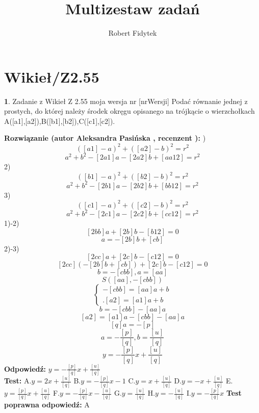 \documentclass[12pt, a4paper]{article}
\title{Multizestaw zadań}
\author{Robert Fidytek}
\date{}
\theoremstyle{definition} %
\newtheorem{zad}{}
\newcommand{\kategoria}[1]{\section{#1}} %
\newcommand{\zadStart}[1]{\begin{zad}#1\newline} %
\newcommand{\zadStop}{\end{zad}}   %
\newcommand{\rozwStart}[2]{\noindent \textbf{Rozwiązanie (autor #1 , recenzent #2): }\newline} %
\newcommand{\rozwStop}{\newline}                                            %
\newcommand{\odpStart}{\noindent \textbf{Odpowiedź:}\newline}    %
\newcommand{\odpStop}{\newline}                                             %
\newcommand{\testStart}{\noindent \textbf{Test:}\newline} %
\newcommand{\testStop}{\newline} %
\newcommand{\kluczStart}{\noindent \textbf{Test poprawna odpowiedź:}\newline} %
\newcommand{\kluczStop}{\newline} %
\begin{document}
\maketitle


\kategoria{Wikieł/Z2.55}
\zadStart{Zadanie z Wikieł Z 2.55 moja wersja nr [nrWersji]}
Podać równanie jednej z prostych, do której należy środek okręgu opisanego na trójkącie o wierzchołkach A([a1],[a2]),B([b1],[b2]),C([c1],[c2]).
\zadStop
\rozwStart{Aleksandra Pasińska}{}
1) $$([a1]-a)^2+([a2]-b)^2=r^2$$
$$a^2+b^2-[2a1]a-[2a2]b+[aa12]=r^2$$
2) $$([b1]-a)^2+([b2]-b)^2=r^2$$
$$a^2+b^2-[2b1]a-[2b2]b+[bb12]=r^2$$
3) $$([c1]-a)^2+([c2]-b)^2=r^2$$
$$a^2+b^2-[2c1]a-[2c2]b+[cc12]=r^2$$
1)-2)$$[2bb]a+[2b]b-[b12]=0$$
$$a=-[2b]b+[cb]$$
2)-3)$$[2cc]a+[2c]b-[c12]=0$$
$$[2cc](-[2b]b+[cb])+[2c]b-[c12]=0$$
$$b=-[cbb], a=[aa]$$
$$S([aa],-[cbb])$$
$$\left\{ \begin{array}{ll}
-[cbb]=[aa]a+b\\ 
.[a2]=[a1]a+b 
\end{array} \right.$$
$$b=-[cbb]-[aa]a$$
$$[a2]=[a1]a-[cbb]-[aa]a$$
$$[q]a=-[p]$$
$$a=-\frac{[p]}{[q]}, b=\frac{[u]}{[q]}$$
$$y=-\frac{[p]}{[q]}x+\frac{[u]}{[q]}$$
\rozwStop
\odpStart
$y=-\frac{[p]}{[q]}x+\frac{[u]}{[q]}$\\
\odpStop
\testStart
A.$y=2x+\frac{[u]}{[q]}$
B.$y=-\frac{[p]}{[q]}x-1$
C.$y=x+\frac{[u]}{[q]}$
D.$y=-x+\frac{[u]}{[q]}$
E.$y=\frac{[p]}{[q]}x+\frac{[u]}{[q]}$
F.$y=-\frac{[p]}{[q]}x-\frac{[u]}{[q]}$
G.$y=\frac{[u]}{[q]}$
H.$ y=-\frac{[u]}{[q]}$
I.$y=-\frac{[p]}{[q]}x$
\testStop
\kluczStart
A
\kluczStop
\end{document}
